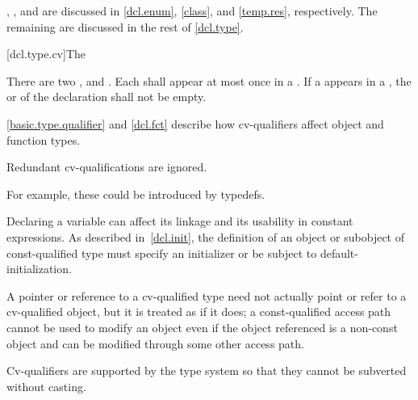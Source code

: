 \pnum
\begin{note}
,
,
and
are discussed
in
\ref{dcl.enum},
\ref{class},
and
\ref{temp.res}, respectively. The remaining
 are discussed in the rest of \ref{dcl.type}.
\end{note}

[dcl.type.cv]{The }%
%
%
%

\pnum
There are two ,  and
. Each  shall appear at most once in
a . If a  appears in a
, the 
or  of
the declaration shall not be empty.
\begin{note}
\ref{basic.type.qualifier} and \ref{dcl.fct} describe how cv-qualifiers affect object and
function types.
\end{note}
Redundant cv-qualifications are ignored.
\begin{note}
For example,
these could be introduced by typedefs.
\end{note}

\pnum
\begin{note}
Declaring a variable  can affect its linkage
and its usability in constant expressions. As
described in~\ref{dcl.init}, the definition of an object or subobject
of const-qualified type must specify an initializer or be subject to
default-initialization.
\end{note}

\pnum
A pointer or reference to a cv-qualified type need not actually point or
refer to a cv-qualified object, but it is treated as if it does; a
const-qualified access path cannot be used to modify an object even if
the object referenced is a non-const object and can be modified through
some other access path.
\begin{note}
Cv-qualifiers are supported by the type system so that they cannot be
subverted without casting.
\end{note}

